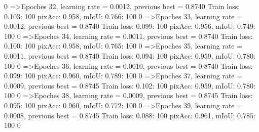   0%
=>Epoches 32, learning rate = 0.0012,                 previous best = 0.8740
Train loss: 0.103: 100%
pixAcc: 0.958, mIoU: 0.766: 100%
  0%
=>Epoches 33, learning rate = 0.0012,                 previous best = 0.8740
Train loss: 0.099: 100%
pixAcc: 0.956, mIoU: 0.749: 100%
  0%
=>Epoches 34, learning rate = 0.0011,                 previous best = 0.8740
Train loss: 0.100: 100%
pixAcc: 0.958, mIoU: 0.765: 100%
  0%
=>Epoches 35, learning rate = 0.0011,                 previous best = 0.8740
Train loss: 0.094: 100%
pixAcc: 0.959, mIoU: 0.780: 100%
  0%
=>Epoches 36, learning rate = 0.0010,                 previous best = 0.8740
Train loss: 0.099: 100%
pixAcc: 0.960, mIoU: 0.789: 100%
  0%
=>Epoches 37, learning rate = 0.0009,                 previous best = 0.8745
Train loss: 0.102: 100%
pixAcc: 0.959, mIoU: 0.780: 100%
  0%
=>Epoches 38, learning rate = 0.0009,                 previous best = 0.8745
Train loss: 0.095: 100%
pixAcc: 0.960, mIoU: 0.772: 100%
  0%
=>Epoches 39, learning rate = 0.0008,                 previous best = 0.8745
Train loss: 0.088: 100%
pixAcc: 0.961, mIoU: 0.785: 100%
  0%
